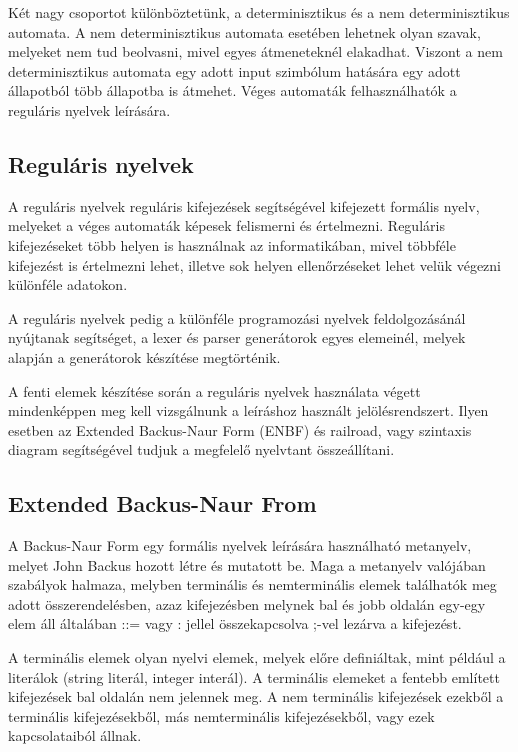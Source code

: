 Két nagy csoportot különböztetünk, a determinisztikus és a nem determinisztikus automata. A nem determinisztikus automata esetében lehetnek olyan szavak, melyeket nem tud beolvasni, mivel egyes átmeneteknél elakadhat. Viszont a nem determinisztikus automata egy adott input szimbólum hatására egy adott állapotból több állapotba is átmehet. Véges automaták felhasználhatók a reguláris nyelvek leírására.


\subsection{Reguláris nyelvek}

A reguláris nyelvek reguláris kifejezések segítségével kifejezett formális nyelv, melyeket a véges automaták képesek felismerni és értelmezni. Reguláris kifejezéseket több helyen is használnak az informatikában, mivel többféle kifejezést is értelmezni lehet, illetve sok helyen ellenőrzéseket lehet velük végezni különféle adatokon.

A reguláris nyelvek pedig a különféle programozási nyelvek feldolgozásánál nyújtanak segítséget, a lexer és parser generátorok egyes elemeinél, melyek alapján a generátorok készítése megtörténik.

A fenti elemek készítése során a reguláris nyelvek használata végett mindenképpen meg kell vizsgálnunk a leíráshoz használt jelölésrendszert. Ilyen esetben az Extended Backus-Naur Form (ENBF) és railroad, vagy szintaxis diagram segítségével tudjuk a megfelelő nyelvtant összeállítani.

\subsection{Extended Backus-Naur From}

A Backus-Naur Form egy formális nyelvek leírására használható metanyelv, melyet John Backus hozott létre és mutatott be. Maga a metanyelv valójában szabályok halmaza, melyben terminális és nemterminális elemek találhatók meg adott összerendelésben, azaz kifejezésben melynek bal és jobb oldalán egy-egy elem áll általában ::= vagy : jellel összekapcsolva ;-vel lezárva a kifejezést.

A terminális elemek olyan nyelvi elemek, melyek előre definiáltak, mint például a literálok (string literál, integer interál). A terminális elemeket a fentebb említett kifejezések bal oldalán nem jelennek meg.
A nem terminális kifejezések ezekből a terminális kifejezésekből, más nemterminális kifejezésekből, vagy ezek kapcsolataiból állnak.

